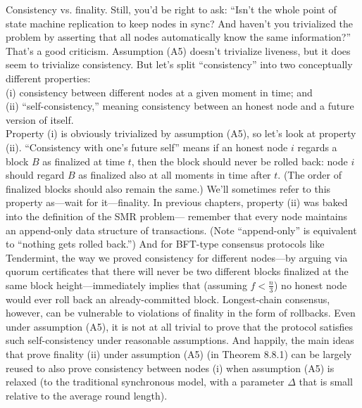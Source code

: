 Consistency vs. finality. Still, you’d be right to ask: “Isn’t the whole point of state
machine replication to keep nodes in sync? And haven’t you trivialized the problem by
asserting that all nodes automatically know the same information?” That’s a good criticism.
Assumption (A5) doesn't trivialize liveness, but it does seem to trivialize consistency. But
let’s split “consistency” into two conceptually different properties:\\
\noindent
(i) consistency between different nodes at a given moment in time; and\\
\noindent
(ii) “self-consistency,” meaning consistency between an honest node and a future version
of itself.\\

Property (i) is obviously trivialized by assumption (A5), so let’s look at property (ii).
“Consistency with one’s future self” means if an honest node $i$ regards a block $B$ as
finalized at time $t$, then the block should never be rolled back: node $i$ should regard $B$ as
finalized also at all moments in time after $t$. (The order of finalized blocks should also remain
the same.) We’ll sometimes refer to this property as—wait for it—finality.
In previous chapters, property (ii) was baked into the definition of the SMR problem—
remember that every node maintains an append-only data structure of transactions. (Note
“append-only” is equivalent to “nothing gets rolled back.”) And for BFT-type consensus
protocols like Tendermint, the way we proved consistency for different nodes—by arguing
via quorum certificates that there will never be two different blocks finalized at the same
block height—immediately implies that (assuming $f < \frac{n}{3}$) no honest node would ever roll
back an already-committed block. Longest-chain consensus, however, can be vulnerable to
violations of finality in the form of rollbacks. Even under assumption (A5), it is not at all
trivial to prove that the protocol satisfies such self-consistency under reasonable assumptions.
And happily, the main ideas that prove finality (ii) under assumption (A5) (in Theorem 8.8.1)
can be largely reused to also prove consistency between nodes (i) when assumption (A5) is
relaxed (to the traditional synchronous model, with a parameter $\Delta$ that is small relative to
the average round length).\\

